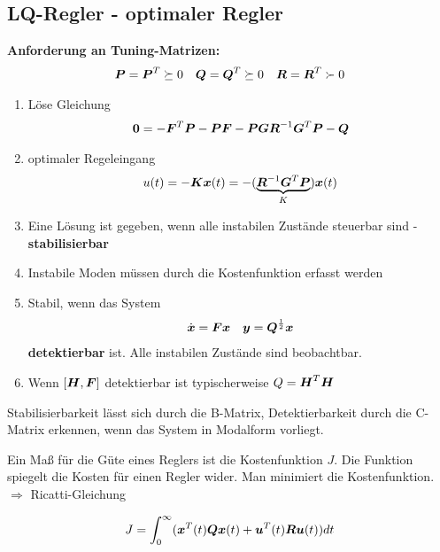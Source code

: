 \subsection{LQ-Regler - optimaler Regler}
\begin{tcolorbox}[colback=white!10!white,colframe=green!30!black] 
    \textbf{Anforderung an Tuning-Matrizen:}
    \begin{align*}
        \boldsymbol{P} = \boldsymbol{P}^T \succeq 0
        && \boldsymbol{Q} = \boldsymbol{Q}^T \succeq 0
        && \boldsymbol{R} = \boldsymbol{R}^T \succ 0
    \end{align*}
    
    \tcblower
    \begin{enumerate}
        \item Löse Gleichung
            \begin{align*}
                \boldsymbol{0} = -\boldsymbol{F}^T\boldsymbol{P} - \boldsymbol{PF}
                - \boldsymbol{PG}\boldsymbol{R}^{-1}\boldsymbol{G}^T\boldsymbol{P} - \boldsymbol{Q}
            \end{align*}
        \item optimaler Regeleingang
        \begin{align*}
            u(t) = - \boldsymbol{Kx}(t) = -(\underbrace{\boldsymbol{R}^{-1}\boldsymbol{G}^T\boldsymbol{P}}_{K})\boldsymbol{x}(t)
        \end{align*}
        \item Eine Lösung ist gegeben, wenn alle instabilen Zustände steuerbar sind  -\textbf{stabilisierbar}
        \item Instabile Moden müssen durch die Kostenfunktion erfasst werden
        \item Stabil, wenn das System \begin{align*}
            \dot{\boldsymbol{x}} = \boldsymbol{Fx} && \boldsymbol{y} = \boldsymbol{Q}^{\frac{1}{2}}\boldsymbol{x} 
        \end{align*}
        \textbf{detektierbar} ist. Alle instabilen Zustände sind beobachtbar.
        \item Wenn $[\boldsymbol{H},\boldsymbol{F}]$ detektierbar ist typischerweise $Q = \boldsymbol{H}^T\boldsymbol{H}$ 
    \end{enumerate}

\begin{tcolorbox}[colback=white!10!white,colframe=gray!30!black] 
    Stabilisierbarkeit lässt sich durch die B-Matrix, Detektierbarkeit durch die C-Matrix erkennen, wenn das System in Modalform vorliegt.
\end{tcolorbox}    
\begin{tcolorbox}[colback=white!10!white,colframe=gray!30!black] 
    Ein Maß für die Güte eines Reglers ist die Kostenfunktion $J$. Die Funktion spiegelt die Kosten  für einen Regler wider. Man minimiert die Kostenfunktion. $\Rightarrow$ Ricatti-Gleichung
    
    \begin{align*}
        J = \int_{0}^{\infty}(\boldsymbol{x}^T(t)\boldsymbol{Qx}(t)+\boldsymbol{u}^T(t)\boldsymbol{Ru}(t))dt
    \end{align*}
\end{tcolorbox}
\end{tcolorbox}
